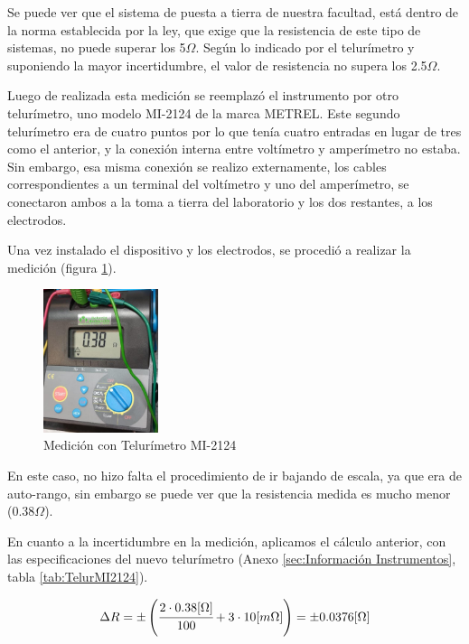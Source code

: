 Se puede ver que el sistema de puesta a tierra de nuestra facultad, está dentro de la norma establecida por la ley, que exige que la resistencia de este tipo de sistemas, no puede superar los 5$\Omega$. Según lo indicado por el telurímetro y suponiendo la mayor incertidumbre, el valor de resistencia no supera los 2.5$\Omega$.

Luego de realizada esta medición se reemplazó el instrumento por otro telurímetro, uno modelo MI-2124 de la marca METREL. Este segundo telurímetro era de cuatro puntos por lo que tenía cuatro entradas en lugar de tres como el anterior, y la conexión interna entre voltímetro y amperímetro no estaba. Sin embargo, esa misma conexión se realizo externamente, los cables correspondientes a un terminal del voltímetro y uno del amperímetro, se conectaron ambos a la toma a tierra del laboratorio y los dos restantes, a los electrodos.

Una vez instalado el dispositivo y los electrodos, se procedió a realizar la medición (figura \ref{fig:tel2lab}). 

\begin{figure}[h!]
        \centering        
        \includegraphics[width=0.3\textwidth]{Imagenes/tel2lab.jpeg}
        \caption{Medición con Telurímetro MI-2124}
        \label{fig:tel2lab}
\end{figure}

En este caso, no hizo falta el procedimiento de ir bajando de escala, ya que era de auto-rango, sin embargo se puede ver que la resistencia medida es mucho menor (0.38$\Omega$). 

En cuanto a la incertidumbre en la medición, aplicamos el cálculo anterior, con las especificaciones del nuevo telurímetro (Anexo \ref{sec:Información Instrumentos}, tabla \ref{tab:TelurMI2124}). 

\begin{equation*}
    \Delta R = \pm \left( \cfrac{2 \cdot 0.38 [\Omega]}{100} + 3 \cdot 10 [m\Omega] \right) = \pm 0.0376 [\Omega]  
\end{equation*}

